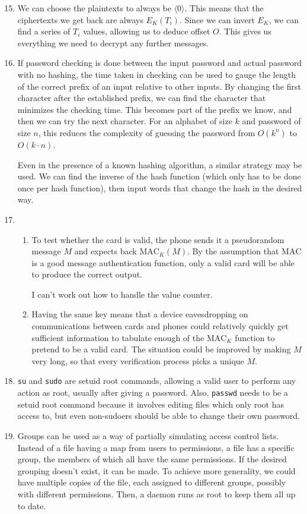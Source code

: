 \documentclass{article}
\begin{document}
\begin{enumerate}
    \setcounter{enumi}{14}
  \item We can choose the plaintexts to always be $\langle 0 \rangle$. This means that the ciphertexts we get back are always $E_K(T_i)$. Since we can invert $E_K$, we can find a series of $T_i$ values, allowing us to deduce offset $O$. This gives us everything we need to decrypt any further messages.
    \setcounter{enumi}{17}
  \item
    If password checking is done between the input password and actual password with no hashing, the time taken in checking can be used to gauge the length of the correct prefix of an input relative to other inputs. By changing the first character after the established prefix, we can find the character that minimizes the checking time. This becomes part of the prefix we know, and then we can try the next character. For an alphabet of size $k$ and password of size $n$, this reduces the complexity of guessing the password from $O(k^n)$ to $O(k \cdot n)$.

    Even in the presence of a known hashing algorithm, a similar strategy may be used. We can find the inverse of the hash function (which only has to be done once per hash function), then input words that change the hash in the desired way.
  \item
    \begin{enumerate}
      \item To test whether the card is valid, the phone sends it a pseudorandom message $M$ and expects back $\mathrm{MAC}_K(M)$. By the assumption that $\mathrm{MAC}$ is a good message authentication function, only a valid card will be able to produce the correct output.

        I can't work out how to handle the value counter.
      \item Having the same key means that a device eavesdropping on communications between cards and phones could relatively quickly get sufficient information to tabulate enough of the $\mathrm{MAC}_K$ function to pretend to be a valid card. The situation could be improved by making $M$ very long, so that every verification process picks a unique $M$.
    \end{enumerate}
    \setcounter{enumi}{23}
  \item \texttt{su} and \texttt{sudo} are setuid root commands, allowing a valid user to perform any action as root, usually after giving a password. Also, \texttt{passwd} needs to be a setuid root command because it involves editing files which only root has access to, but even non-sudoers should be able to change their own password.
  \item Groups can be used as a way of partially simulating access control lists. Instead of a file having a map from users to permissions, a file has a specific group, the members of which all have the same permissions. If the desired grouping doesn't exist, it can be made. To achieve more generality, we could have multiple copies of the file, each assigned to different groups, possibly with different permissions. Then, a daemon runs as root to keep them all up to date.


\end{enumerate}
\end{document}
